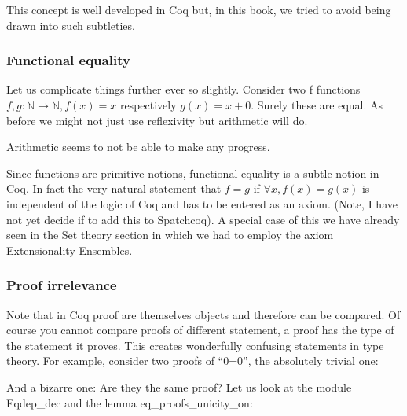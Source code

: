   This concept is well developed in Coq but, in this book,  we tried to avoid being drawn into such subtleties.
  
  \subsubsection{Functional equality}
  
   Let us complicate things further ever so slightly. Consider two f functions $f, g:\mathbb{N}\rightarrow \mathbb{N}, f(x)=x$ respectively $g(x)=x+0$. Surely these are equal. As before we might not just use reflexivity but arithmetic will do.

Arithmetic seems to not be able to make any progress.

 Since functions are primitive notions, functional equality is a subtle notion in Coq. In fact the very natural  statement that $f=g$ if $\forall x, f(x)=g(x)$ is independent of the logic of Coq and has to be entered as an axiom. (Note, I have not yet decide if to add this to Spatchcoq).
A special case of this we have already seen in the Set theory section in which we had to employ the axiom Extensionality Ensembles.


\subsubsection{Proof irrelevance}

Note that in Coq proof are themselves objects and therefore can be compared. Of course you cannot compare proofs of different statement, a proof has the type of the statement it proves.  This creates  wonderfully confusing statements in type theory. For example, consider  two proofs of ``0=0'', the absolutely trivial one:

And a bizarre one:
Are they  the same proof? Let us look at the  module Eqdep\_dec and the lemma eq\_proofs\_unicity\_on: 

